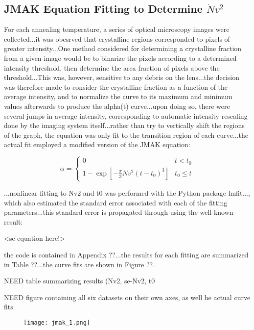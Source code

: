\subsection{JMAK Equation Fitting to Determine $\dot{N}v^2$}

For each annealing temperature, a series of optical microscopy images were collected...it was obesrved that crystalline regions corresponded to pixels of greater intensity...One method considered for determining a crystalline fraction from a given image would be to binarize the pixels according to a determined intensity threshold, then determine the area fraction of pixels above the threshold...This was, however, sensitive to any debris on the lens...the decision was therefore made to consider the crystalline fraction as a function of the average intensity, and to normalize the curve to its maximum and minimum values afterwards to produce the alpha(t) curve...upon doing so, there were several jumps in average intensity, corresponding to automatic intensity rescaling done by the imaging system itself...rather than try to vertically shift the regions of the graph, the equation was only fit to the transition region of each curve...the actual fit employed a modified version of the JMAK equation:

	\begin{equation}
	\alpha =
	\begin{cases}
		0 & t < t_0 \\
		1 - \exp \left[ -\frac{\pi}{3} \dot{N} v^2 (t-t_0)^3 
			\right] & t_0 \leq t
	\end{cases}
	\end{equation}

...nonlinear fitting to Nv2 and t0 was performed with the Python package lmfit..., which also estimated the standard error associated with each of the fitting parameters...this standard error is propagated through using the well-known result:

<se equation here!>

the code is contained in Appendix ??...the results for each fitting are summarized in Table ??...the curve fits are shown in Figure ??.

NEED table summarizing results (Nv2, se-Nv2, t0

NEED figure containing all six datasets on their own axes, as well he actual curve fits

	\begin{figure}[h]
		\centering
		\texttt{[image: jmak\_1.png]}
		\caption{}
		\label{fig:jmak_1}
	\end{figure}

